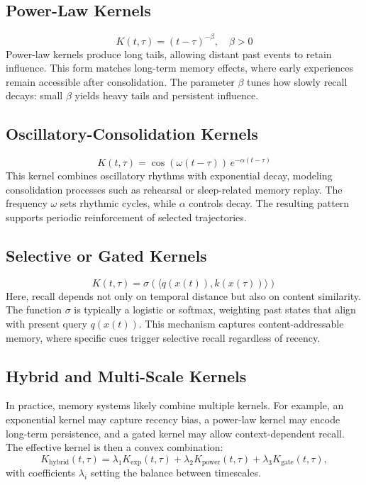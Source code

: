 \documentclass[a4paper,12pt]{article}
\begin{document}
\subsection*{Power-Law Kernels}
\[
K(t,\tau) = (t-\tau)^{-\beta}, \quad \beta > 0
\]
Power-law kernels produce long tails, allowing distant past events to retain 
influence. This form matches long-term memory effects, where early experiences 
remain accessible after consolidation. The parameter $\beta$ tunes how slowly 
recall decays: small $\beta$ yields heavy tails and persistent influence.

\subsection*{Oscillatory-Consolidation Kernels}
\[
K(t,\tau) = \cos(\omega (t-\tau)) \, e^{-\alpha (t-\tau)}
\]
This kernel combines oscillatory rhythms with exponential decay, modeling 
consolidation processes such as rehearsal or sleep-related memory replay. 
The frequency $\omega$ sets rhythmic cycles, while $\alpha$ controls decay. 
The resulting pattern supports periodic reinforcement of selected trajectories.

\subsection*{Selective or Gated Kernels}
\[
K(t,\tau) = \sigma(\langle q(x(t)), k(x(\tau)) \rangle)
\]
Here, recall depends not only on temporal distance but also on content similarity. 
The function $\sigma$ is typically a logistic or softmax, weighting past states 
that align with present query $q(x(t))$. This mechanism captures content-addressable 
memory, where specific cues trigger selective recall regardless of recency.

\subsection*{Hybrid and Multi-Scale Kernels}
In practice, memory systems likely combine multiple kernels. For example, an 
exponential kernel may capture recency bias, a power-law kernel may encode 
long-term persistence, and a gated kernel may allow context-dependent recall. 
The effective kernel is then a convex combination:
\[
K_{\text{hybrid}}(t,\tau) = \lambda_1 K_{\exp}(t,\tau) + \lambda_2 K_{\text{power}}(t,\tau) + \lambda_3 K_{\text{gate}}(t,\tau),
\]
with coefficients $\lambda_i$ setting the balance between timescales.
\end{document}
